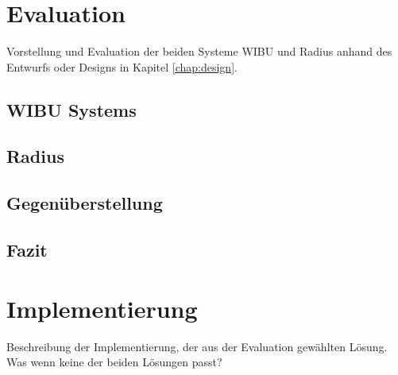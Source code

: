 \documentclass[11pt,a4paper]{report}
\begin{document}
\chapter{Evaluation} \label{chap:evaluation}

Vorstellung und Evaluation der beiden Systeme WIBU und Radius anhand des Entwurfs oder Designs in Kapitel \ref{chap:design}.

\section{WIBU Systems}

\section{Radius}

\section{Gegenüberstellung}

\section{Fazit}

\chapter{Implementierung} \label{chap:implementation}

Beschreibung der Implementierung, der aus der Evaluation gewählten Lösung. Was wenn keine der beiden Lösungen passt?
\end{document}
